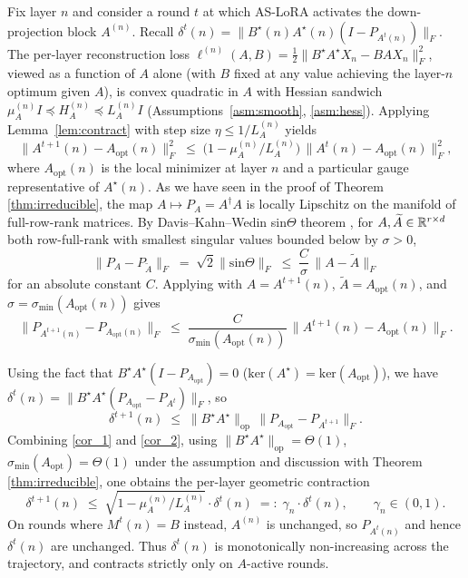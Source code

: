 Fix layer $n$ and consider a round $t$ at which AS-LoRA activates the down-projection block $A^{(n)}$. Recall $\delta^t(n) = \|B^\star(n)A^\star(n)(I-P_{A^t(n)})\|_F$. The per-layer reconstruction loss $\ell^{(n)}(A,B) = \tfrac12\|B^\star A^\star X_n - BA X_n\|_F^2$, viewed as a function of $A$ alone (with $B$ fixed at any value achieving the layer-$n$ optimum given $A$), is convex quadratic in $A$ with Hessian sandwich $\mu_A^{(n)} I\preceq H_A^{(n)}\preceq L_A^{(n)} I$ (Assumptions~\ref{asm:smooth}, \ref{asm:hess}). Applying Lemma~\ref{lem:contract} with step size $\eta\le 1/L_A^{(n)}$ yields
\begin{equation} \label{cor_1}
\|A^{t+1}(n)-A_\text{opt}(n)\|_F^2 \;\le\; \bigl(1-\mu_A^{(n)}/L_A^{(n)}\bigr)\,\|A^t(n)-A_\text{opt}(n)\|_F^2,
\end{equation}
where $A_\text{opt}(n)$ is the local minimizer at layer $n$ and a particular gauge representative of $A^\star(n)$. As we have seen in the proof of Theorem \ref{thm:irreducible}, the map $A\mapsto P_A=A^\dagger A$ is locally Lipschitz on the manifold of full-row-rank matrices. By Davis--Kahn--Wedin sin$\Theta$ theorem \citep{wedin1972}, for $A,\widetilde A\in\mathbb{R}^{r\times d}$ both row-full-rank with smallest singular values bounded below by $\sigma>0$,
\begin{equation}
\bigl\|P_A - P_{\widetilde A}\bigr\|_F \; = \; \sqrt{2}\bigl\|\mathrm{sin}\Theta \bigr\|_F \;\le\; \frac{C}{\sigma}\,\bigl\|A-\widetilde A\bigr\|_F
\end{equation}
for an absolute constant $C$. Applying with $A=A^{t+1}(n)$, $\widetilde A=A_\text{opt}(n)$, and $\sigma=\sigma_{\min}(A_\text{opt}(n))$ gives
\begin{equation}\label{cor_2}
\|P_{A^{t+1}(n)}-P_{A_\text{opt}(n)}\|_F \;\le\; \frac{C}{\sigma_{\min}(A_\text{opt}(n))}\,\|A^{t+1}(n)-A_\text{opt}(n)\|_F.
\end{equation}

Using the fact that $B^\star A^\star (I-P_{A_\text{opt}})=0$ ($\mathrm{ker}(A^{\star})=\mathrm{ker}(A_{\mathrm{opt}})$), we have $\delta^t(n)=\|B^\star A^\star(P_{A_\text{opt}}-P_{A^t})\|_F$, so
\begin{equation}
\delta^{t+1}(n) \;\le\; \|B^\star A^\star\|_\text{op}\,\|P_{A_\text{opt}}-P_{A^{t+1}}\|_F.
\end{equation}
Combining \eqref{cor_1} and \eqref{cor_2}, using $\|B^\star A^\star\|_\text{op}=\Theta(1)$, $\sigma_{\min}(A_\text{opt})=\Theta(1)$ under the assumption and discussion with Theorem \ref{thm:irreducible}, one obtains the per-layer geometric contraction
\begin{equation} \label{geometric_cont}
\delta^{t+1}(n) \;\le\; \sqrt{1-\mu_A^{(n)}/L_A^{(n)}}\cdot\delta^t(n) \;=:\; \gamma_n\cdot\delta^t(n), \qquad \gamma_n\in(0,1).
\end{equation}
On rounds where $M^t(n)=B$ instead, $A^{(n)}$ is unchanged, so $P_{A^t(n)}$ and hence $\delta^t(n)$ are unchanged. Thus $\delta^t(n)$ is monotonically non-increasing across the trajectory, and contracts strictly only on $A$-active rounds.

